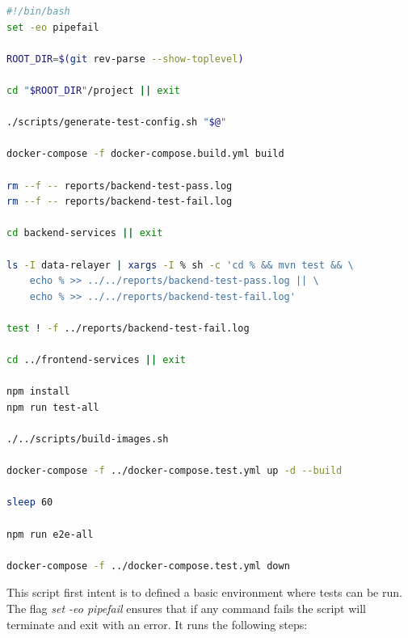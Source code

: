 \begin{lstlisting}[language=bash, style=bash, caption=Sensae Console Test Suite Script, label={code:implementation:decisions:actions:testscript}]
#!/bin/bash
set -eo pipefail

ROOT_DIR=$(git rev-parse --show-toplevel)

cd "$ROOT_DIR"/project || exit

./scripts/generate-test-config.sh "$@"

docker-compose -f docker-compose.build.yml build

rm --f -- reports/backend-test-pass.log
rm --f -- reports/backend-test-fail.log

cd backend-services || exit

ls -I data-relayer | xargs -I % sh -c 'cd % && mvn test && \
    echo % >> ../../reports/backend-test-pass.log || \
    echo % >> ../../reports/backend-test-fail.log'

test ! -f ../reports/backend-test-fail.log

cd ../frontend-services || exit

npm install
npm run test-all

./../scripts/build-images.sh

docker-compose -f ../docker-compose.test.yml up -d --build

sleep 60

npm run e2e-all

docker-compose -f ../docker-compose.test.yml down    
\end{lstlisting}

This script first intent is to defined a basic environment where tests can be run.
The flag \textit{set -eo pipefail} ensures that if any command fails the script will terminate and exit with an error.
It runs the following steps:

